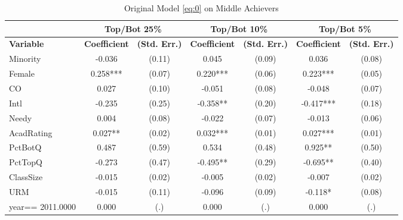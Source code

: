 \begin{sidewaystable}[htb]\centering
  \begin{threeparttable}
    \caption{Original Model \eqref{eq:0} on Middle Achievers}\label{table:c1}
    \begin{tabular}{l|c|c|c|c|c|c}
      \hline\hline 
                        & \multicolumn{2}{|c|}{Top/Bot 25\%} & \multicolumn{2}{|c|}{Top/Bot 10\%} & \multicolumn{2}{|c}{Top/Bot 5\%}                                                               \\
      \hline
      \textbf{Variable} & \textbf{Coefficient}         & \textbf{(Std. Err.)}         & \textbf{Coefficient} & \textbf{(Std. Err.)} & \textbf{Coefficient} & \textbf{(Std. Err.)} \\ 
      \hline
      \hline 
      Minority          & -0.036                   & (0.11)                    & 0.045     & (0.09) & 0.036     & (0.08) \\
      Female            & 0.258***                 & (0.07)                    & 0.220***  & (0.06) & 0.223***  & (0.05) \\
      CO                & 0.027                    & (0.10)                    & -0.051    & (0.08) & -0.048    & (0.07) \\
      Intl              & -0.235                   & (0.25)                    & -0.358**  & (0.20) & -0.417*** & (0.18) \\
      Needy             & 0.004                    & (0.08)                    & -0.022    & (0.07) & -0.013    & (0.06) \\
      AcadRating        & 0.027**                  & (0.02)                    & 0.032***  & (0.01) & 0.027***  & (0.01) \\
      PctBotQ           & 0.487                    & (0.59)                    & 0.534     & (0.48) & 0.925**   & (0.50) \\
      PctTopQ           & -0.273                   & (0.47)                    & -0.495**  & (0.29) & -0.695**  & (0.40) \\
      ClassSize         & -0.015                   & (0.02)                    & -0.005    & (0.02) & -0.007    & (0.02) \\
      URM               & -0.015                   & (0.11)                    & -0.096    & (0.09) & -0.118*   & (0.08) \\
      year==  2011.0000 & 0.000                    & (.)                       & 0.000     & (.)    & 0.000     & (.)    \\

\end{tabular}
\end{threeparttable}
\end{sidewaystable}
